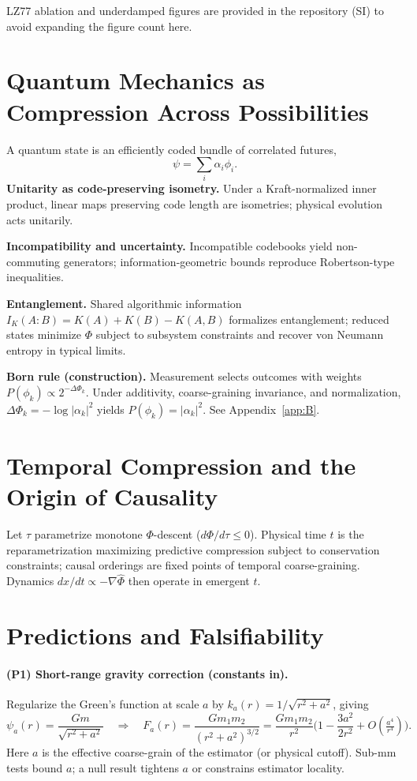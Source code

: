 \documentclass[aps,preprint,onecolumn,longbibliography,nofootinbib]{revtex4-2}
\numberwithin{equation}{section}        %
\begin{document}
\noindent LZ77 ablation and underdamped figures are provided in the repository (SI) to avoid expanding the figure count here.

\section{Quantum Mechanics as Compression Across Possibilities}
A quantum state is an efficiently coded bundle of correlated futures,
\begin{equation}
\psi=\sum_i \alpha_i \phi_i. \label{eq:super}
\end{equation}
\textbf{Unitarity as code-preserving isometry.} Under a Kraft-normalized inner product, linear maps preserving code length are isometries; physical evolution acts unitarily.

\textbf{Incompatibility and uncertainty.} Incompatible codebooks yield non-commuting generators; information-geometric bounds reproduce Robertson-type inequalities.

\textbf{Entanglement.} Shared algorithmic information $I_K(A\!:\!B)=K(A)+K(B)-K(A,B)$ formalizes entanglement; reduced states minimize $\Phi$ subject to subsystem constraints and recover von Neumann entropy in typical limits.

\textbf{Born rule (construction).} Measurement selects outcomes with weights $P(\phi_k)\propto 2^{-\Delta\Phi_k}$. Under additivity, coarse-graining invariance, and normalization, $\Delta\Phi_k=-\log|\alpha_k|^2$ yields $P(\phi_k)=|\alpha_k|^2$. See Appendix~\ref{app:B}.

\section{Temporal Compression and the Origin of Causality}
Let $\tau$ parametrize monotone $\Phi$-descent ($d\Phi/d\tau\le 0$). Physical time $t$ is the reparametrization maximizing predictive compression subject to conservation constraints; causal orderings are fixed points of temporal coarse-graining. Dynamics $dx/dt\propto-\nabla\widehat\Phi$ then operate in emergent $t$.

\section{Predictions and Falsifiability}
\paragraph*{(P1) Short-range gravity correction (constants in).}
Regularize the Green’s function at scale $a$ by $k_a(r)=1/\sqrt{r^2+a^2}$, giving
\begin{equation}
\psi_a(r)=\frac{G m}{\sqrt{r^2+a^2}}
\quad\Rightarrow\quad
F_a(r)=\frac{G m_1 m_2}{(r^2+a^2)^{3/2}}
=\frac{G m_1 m_2}{r^2}\Big(1-\frac{3a^2}{2r^2}+O(\tfrac{a^4}{r^4})\Big). \label{eq:short}
\end{equation}
Here $a$ is the effective coarse-grain of the estimator (or physical cutoff). Sub-mm tests bound $a$; a null result tightens $a$ or constrains estimator locality.
\end{document}
